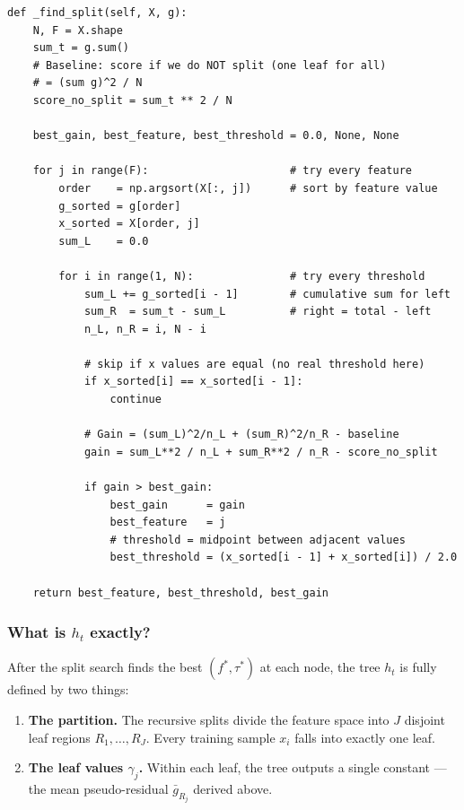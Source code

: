 \documentclass[11pt, a4paper]{article}
\begin{document}
\begin{listing}[H]
\caption{Split search (\texttt{vanilla\_gbm.py})}
\begin{verbatim}
def _find_split(self, X, g):
    N, F = X.shape
    sum_t = g.sum()
    # Baseline: score if we do NOT split (one leaf for all)
    # = (sum g)^2 / N
    score_no_split = sum_t ** 2 / N

    best_gain, best_feature, best_threshold = 0.0, None, None

    for j in range(F):                      # try every feature
        order    = np.argsort(X[:, j])      # sort by feature value
        g_sorted = g[order]
        x_sorted = X[order, j]
        sum_L    = 0.0

        for i in range(1, N):               # try every threshold
            sum_L += g_sorted[i - 1]        # cumulative sum for left
            sum_R  = sum_t - sum_L          # right = total - left
            n_L, n_R = i, N - i

            # skip if x values are equal (no real threshold here)
            if x_sorted[i] == x_sorted[i - 1]:
                continue

            # Gain = (sum_L)^2/n_L + (sum_R)^2/n_R - baseline
            gain = sum_L**2 / n_L + sum_R**2 / n_R - score_no_split

            if gain > best_gain:
                best_gain      = gain
                best_feature   = j
                # threshold = midpoint between adjacent values
                best_threshold = (x_sorted[i - 1] + x_sorted[i]) / 2.0

    return best_feature, best_threshold, best_gain
\end{verbatim}
\end{listing}

\subsubsection{What is $h_t$ exactly?}

After the split search finds the best $(f^*, \tau^*)$ at each node,
the tree $h_t$ is fully defined by two things:

\begin{enumerate}
  \item \textbf{The partition.}
    The recursive splits divide the feature space into $J$ disjoint leaf
    regions $R_1, \ldots, R_J$.
    Every training sample $x_i$ falls into exactly one leaf.

  \item \textbf{The leaf values $\gamma_j$.}
    Within each leaf, the tree outputs a single constant --- the mean
    pseudo-residual $\bar{g}_{R_j}$ derived above.
\end{enumerate}
\end{document}
